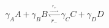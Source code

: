 \begin{equation}\label{eqn:simple_reaction_scheme}
\gamma_A A + \gamma_B B \overset{\overset{r_+}{\rightharpoonup}}{\underset{r_-}{\leftharpoondown}} \gamma_C C + \gamma_D D
\end{equation}